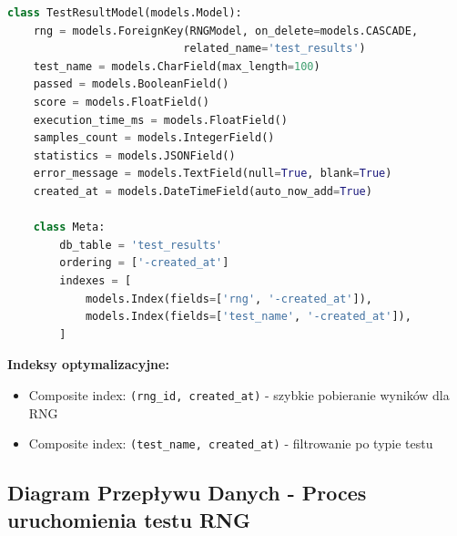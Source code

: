 \documentclass[12pt,a4paper]{article}
\begin{document}
\begin{lstlisting}[language=Python]
class TestResultModel(models.Model):
    rng = models.ForeignKey(RNGModel, on_delete=models.CASCADE,
                           related_name='test_results')
    test_name = models.CharField(max_length=100)
    passed = models.BooleanField()
    score = models.FloatField()
    execution_time_ms = models.FloatField()
    samples_count = models.IntegerField()
    statistics = models.JSONField()
    error_message = models.TextField(null=True, blank=True)
    created_at = models.DateTimeField(auto_now_add=True)
    
    class Meta:
        db_table = 'test_results'
        ordering = ['-created_at']
        indexes = [
            models.Index(fields=['rng', '-created_at']),
            models.Index(fields=['test_name', '-created_at']),
        ]
\end{lstlisting}

\textbf{Indeksy optymalizacyjne:}
\begin{itemize}
    \item Composite index: \texttt{(rng\_id, created\_at)} - szybkie pobieranie wyników dla RNG
    \item Composite index: \texttt{(test\_name, created\_at)} - filtrowanie po typie testu
\end{itemize}

\subsection{Diagram Przepływu Danych - Proces uruchomienia testu RNG}
\end{document}
